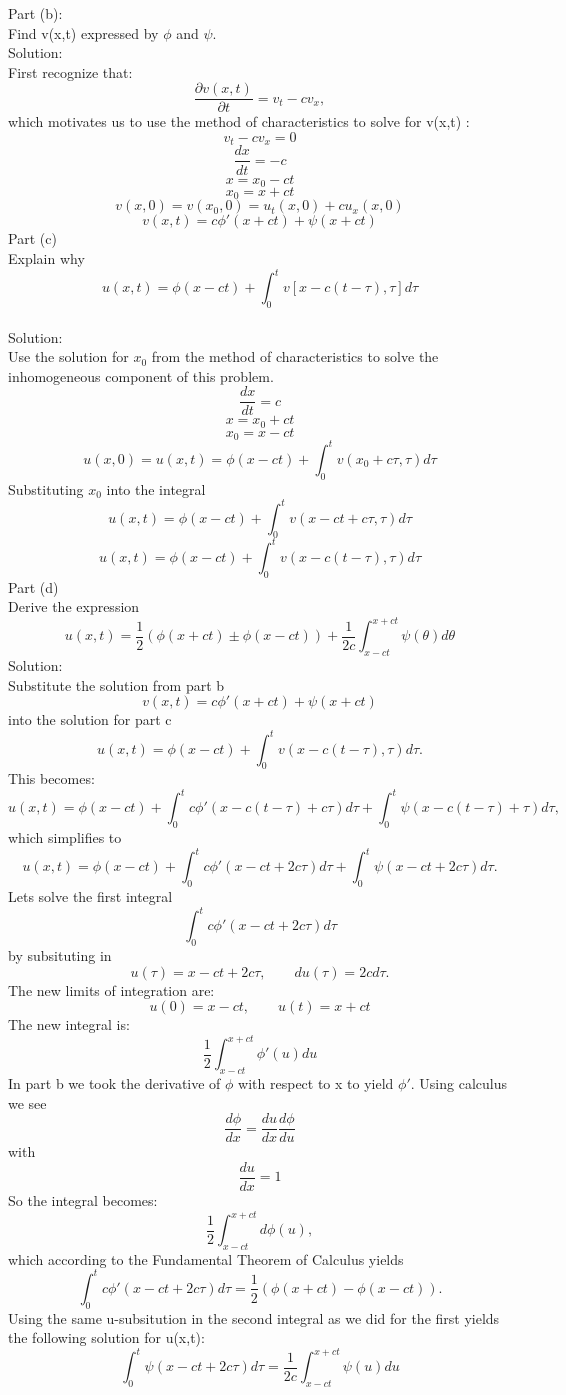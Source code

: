 \documentclass{article}
\begin{document}
Part (b):\\
 Find v(x,t) expressed by $\phi$ and $\psi$.\\
Solution:\\
First recognize that:\\
\[ \frac{\partial v(x,t) }{\partial t} = v_{t} - cv_{x},\]
which motivates us to use the method of characteristics to solve for v(x,t)  :\\
\[ v_{t} - cv_{x}=0\]
\[ \frac{dx}{dt} = -c\]
\[ x = x_{0} -ct\]
\[x_{0} = x + ct\]
\[ v(x,0) = v(x_{0},0) =  u_{t}(x,0) + cu_{x}(x,0)\]
\[ v(x,t) = c\phi ' (x+ct) + \psi(x+ct) \]
Part (c)\\
Explain why
\[ u(x,t) = \phi(x-ct) + \int_{0}^{t} v[x-c(t-\tau),\tau]d\tau\]
\\
Solution:\\
Use the solution for $x_{0}$ from the method of characteristics to solve the inhomogeneous component of this problem.
\[\frac{dx}{dt} = c\]
\[ x = x_{0} +ct\]
\[ x_{0} = x-ct\]
\[u(x,0)= u(x,t) = \phi(x-ct) + \int_{0}^{t}v(x_{0}+c\tau, \tau) d\tau\]
Substituting $ x_{0}$ into the integral\\
\[u(x,t) = \phi(x-ct) + \int_{0}^{t}v(x - ct + c\tau,\tau)d\tau\]
\[u(x,t) = \phi(x-ct) + \int_{0}^{t}v(x-c(t-\tau),\tau)  d\tau\]
Part (d)\\
Derive the expression\\
\[ u(x,t) = \frac{1}{2}(\phi(x+ct) \pm \phi(x-ct)) +\frac{1}{2c}\int_{x-ct}^{x+ct}\psi(\theta)d\theta\]
Solution:\\
Substitute the solution from part b
\[ v(x,t) = c\phi ' (x+ct) + \psi(x+ct) \]
into the solution for part c\\
\[u(x,t) = \phi(x-ct) + \int_{0}^{t}v(x-c(t-\tau),\tau)  d\tau.\]
This becomes:
\[ u(x,t) = \phi(x-ct) + \int_{0}^{t}c\phi'(x-c(t-\tau) +c\tau)d\tau + \int_{0}^{t}\psi(x-c(t-\tau)+\tau)d\tau,\]
which simplifies to
\[ u(x,t) = \phi(x-ct) + \int_{0}^{t}c\phi'(x-ct +2c\tau)d\tau + \int_{0}^{t}\psi(x-ct+2c\tau)d\tau.\]
Lets solve the first integral
\[\int_{0}^{t}c\phi'(x-ct +2c\tau)d\tau\]
by subsituting in
\[ u(\tau) = x -ct + 2c\tau, \qquad du(\tau) = 2cd\tau. \]
The new limits of integration are:
\[u(0) = x - ct, \qquad u(t) = x + ct\]
The new integral is:
\[\frac{1}{2}\int_{x-ct}^{x+ct}\phi'(u)du\]
In part b we took the derivative of $\phi$ with respect to x to yield $\phi'$. Using calculus we see
\[\frac{d\phi}{dx} = \frac{du}{dx}\frac{d\phi}{du}\]
with
\[\frac{du}{dx} = 1\]
So the integral becomes:
\[\frac{1}{2}\int_{x-ct}^{x+ct}d\phi(u),\]
which according to the Fundamental Theorem of Calculus yields
\[ \int_{0}^{t}c\phi'(x-ct +2c\tau)d\tau = \frac{1}{2}(\phi(x+ct)-\phi(x-ct)).\]
Using the same u-subsitution in the second integral as we did for the first yields the following solution for u(x,t):
\[ \int_{0}^{t}\psi(x-ct+2c\tau)d\tau= \frac{1}{2c}\int_{x-ct}^{x+ct}\psi(u)du\]
\end{document}
